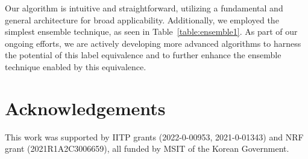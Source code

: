 \documentclass[letterpaper]{article} %
\newcommand{\nj}[1]{\textcolor{black}{#1}}
\begin{document}
Our algorithm is intuitive and straightforward, utilizing a fundamental and general architecture for broad applicability. %
Additionally, we employed the simplest %
ensemble technique, as seen in Table~\ref{table:ensemble1}. As part of our ongoing efforts, we are actively developing more advanced algorithms to harness the potential of this label equivalence and to further enhance the ensemble technique enabled by this equivalence.
\begin{table}[t]
\centering
\caption{Testing the effectiveness of injecting semantic information to fixed-way meta-learning. The \nj{numbers in parentheses are the number of shots}. M and C refer \nj{to} MiniImageNet and Cars, \nj{respectively. `+semantic' indicates a model trained with an additional semantic classifier with the $L_{semantic}$ loss. } Note that the class in the test phase is totally unseen during training.} %
\label{table:fixedsemantic}
\end{table}

\section{Acknowledgements}
This work was supported by IITP grants (2022-0-00953, 2021-0-01343) and NRF grant (2021R1A2C3006659), all funded by MSIT of the Korean Government.
\end{document}
